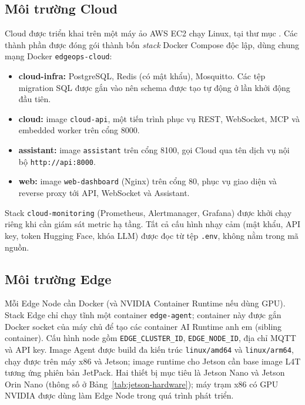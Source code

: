 \subsection{Môi trường Cloud}

Cloud được triển khai trên một máy ảo AWS EC2 chạy Linux, tại thư mục
. Các thành phần được đóng gói thành bốn \emph{stack} Docker
Compose độc lập, dùng chung mạng Docker \texttt{edgeops-cloud}:

\begin{itemize}
  \item \textbf{cloud-infra:} PostgreSQL, Redis (có mật khẩu), Mosquitto. Các tệp
        migration SQL được gắn vào  nên schema
        được tạo tự động ở lần khởi động đầu tiên.
  \item \textbf{cloud:} image \texttt{cloud-api}, một tiến trình phục vụ REST,
        WebSocket, MCP và embedded worker trên cổng 8000.
  \item \textbf{assistant:} image \texttt{assistant} trên cổng 8100, gọi Cloud qua
        tên dịch vụ nội bộ \texttt{http://api:8000}.
  \item \textbf{web:} image \texttt{web-dashboard} (Nginx) trên cổng 80, phục vụ
        giao diện và reverse proxy tới API, WebSocket và Assistant.
\end{itemize}

Stack \texttt{cloud-monitoring} (Prometheus, Alertmanager, Grafana) được khởi chạy
riêng khi cần giám sát metric hạ tầng. Tất cả cấu hình nhạy cảm (mật khẩu, API
key, token Hugging Face, khóa LLM) được đọc từ tệp \texttt{.env}, không nằm trong
mã nguồn.

\subsection{Môi trường Edge}

Mỗi Edge Node cần Docker (và NVIDIA Container Runtime nếu dùng GPU). Stack Edge
chỉ chạy tĩnh một container \texttt{edge-agent}; container này được gắn Docker
socket của máy chủ để tạo các container AI Runtime anh em (sibling container).
Cấu hình node gồm \texttt{EDGE\_CLUSTER\_ID}, \texttt{EDGE\_NODE\_ID}, địa chỉ
MQTT và API key. Image Agent được build đa kiến trúc \texttt{linux/amd64} và
\texttt{linux/arm64}, chạy được trên máy x86 và Jetson; image runtime cho Jetson
cần base image L4T tương ứng phiên bản JetPack. Hai thiết bị mục tiêu là Jetson
Nano và Jetson Orin Nano (thông số ở Bảng~\ref{tab:jetson-hardware}); máy trạm x86
có GPU NVIDIA được dùng làm Edge Node trong quá trình phát triển.

